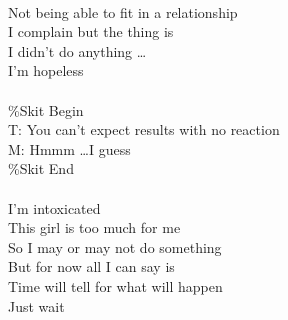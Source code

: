 \documentclass[12pt, b5paper, oneside]{book}
\begin{document}
\\Not being able to fit in a relationship
\\I complain but the thing is
\\I didn't do anything \dots 
\\I'm hopeless
%
\\\\\%Skit Begin
\\T: You can't expect results with no reaction
\\M: Hmmm \dots I guess
\\\%Skit End
%
\\\\I'm intoxicated
\\This girl is too much for me
\\So I may or may not do something
\\But for now all I can say is
\\Time will tell for what will happen
\\Just wait


\newpage
\end{document}
